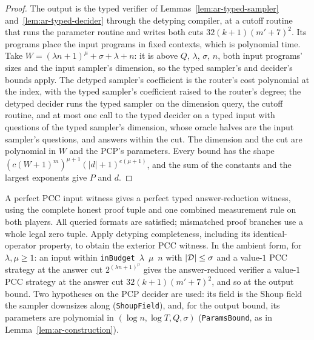 \begin{proof}
\leanok
The output is the typed verifier of Lemmas~\ref{lem:ar-typed-sampler} and~\ref{lem:ar-typed-decider}
through the detyping compiler, at a cutoff routine that runs the parameter routine and writes both
cuts $32(k+1)(m'+7)^2$. Its programs place the input programs in fixed contexts, which is
polynomial time. Take $W=(\lambda n+1)^\mu+\sigma+\lambda+n$: it is above $Q$, $\lambda$, $\sigma$,
$n$, both input programs' sizes and the input sampler's dimension, so the typed sampler's and
decider's bounds apply. The detyped sampler's coefficient is the router's cost polynomial at the
index, with the typed sampler's coefficient raised to the router's degree; the detyped decider
runs the typed sampler on the dimension query, the cutoff routine, and at most one call to the
typed decider on a typed input with questions of the typed sampler's dimension, whose oracle
halves are the input sampler's questions, and answers within the cut. The dimension and the cut
are polynomial in $W$ and the PCP's parameters. Every bound has the shape
$(c(W+1)^m)^{\mu+1}(|d|+1)^{e(\mu+1)}$, and the sum of the constants and the largest exponents
give $P$ and $d$.
\end{proof}

\begin{lemma}
\label{lem:ar-completeness}
\leanok
A perfect PCC input witness gives a perfect typed answer-reduction witness,
using the complete honest proof tuple and one combined measurement rule on
both players. All queried formats are satisfied; mismatched proof branches
use a whole legal zero tuple. Apply detyping completeness, including its
identical-operator property, to obtain the exterior PCC witness.
In the ambient form, for $\lambda,\mu\geq1$: an input within
\texttt{inBudget}~$\lambda$~$\mu$~$n$ with $\left\vert {\mathcal{D}} \right\vert\leq\sigma$ and a value-$1$ PCC
strategy at the answer cut $2^{(\lambda n+1)^\mu}$ gives the answer-reduced verifier a value-$1$
PCC strategy at the answer cut $32(k+1)(m'+7)^2$, and so at the output bound. Two hypotheses on
the PCP decider are used: its field is the Shoup field the sampler downsizes along
(\texttt{ShoupField}), and, for the output bound, its parameters are polynomial in
$(\log n,\log T,Q,\sigma)$ (\texttt{ParamsBound}, as in Lemma~\ref{lem:ar-construction}).
\end{lemma}

